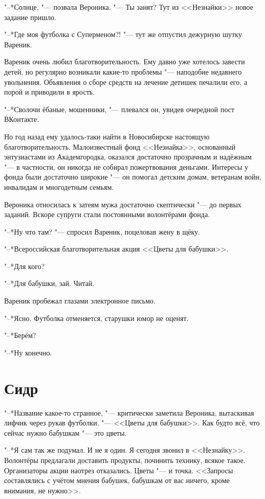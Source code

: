 "--*Солнце, "--- позвала Вероника.
"--- Ты занят?
Тут из <<Незнайки>> новое задание пришло.

"--*Где моя футболка с Суперменом?! "--- тут же отпустил дежурную шутку Вареник.

Вареник очень любил благотворительность.
Ему давно уже хотелось завести детей, но регулярно возникали какие-то проблемы "--- наподобие недавнего увольнения.
Объявления о сборе средств на лечение детишек печалили его, а порой и приводили в ярость.

"--*Сволочи ёбаные, мошенники, "--- плевался он, увидев очередной пост ВКонтакте.

Но год назад ему удалось-таки найти в Новосибирске настоящую благотворительность.
Малоизвестный фонд <<Незнайка>>, основанный энтузиастами из Академгородка, оказался достаточно прозрачным и надёжным "--- в частности, он никогда не собирал пожертвования деньгами.
Интересы у фонда были достаточно широкие "--- он помогал детским домам, ветеранам войн, инвалидам и многодетным семьям.

Вероника относилась к затеям мужа достаточно скептически "--- до первых заданий.
Вскоре супруги стали постоянными волонтёрами фонда.

"--*Ну что там? "--- спросил Вареник, поцеловав жену в щёку.

"--*Всероссийская благотворительная акция <<Цветы для бабушки>>.

"--*Для кого?

"--*Для бабушки, зай.
Читай.

Вареник пробежал глазами электронное письмо.

"--*Ясно.
Футболка отменяется, старушки юмор не оценят.

"--*Берём?

"--*Ну конечно.

\section{Сидр}

"--*Название какое-то странное, "--- критически заметила Вероника, вытаскивая лифчик через рукав футболки.
"--- <<Цветы для бабушки>>.
Как будто всё, что сейчас нужно бабушкам "--- это цветы.

"--*Я сам так же подумал.
И не я один.
Я сегодня звонил в <<Незнайку>>.
Волонтёры предлагали доставить продукты, починить технику, всякое такое.
Организаторы акции наотрез отказались.
Цветы "--- и точка.
<<Запросы составлялись с учётом мнения бабушек, бабушкам от вас ничего, кроме внимания, не нужно>>.

